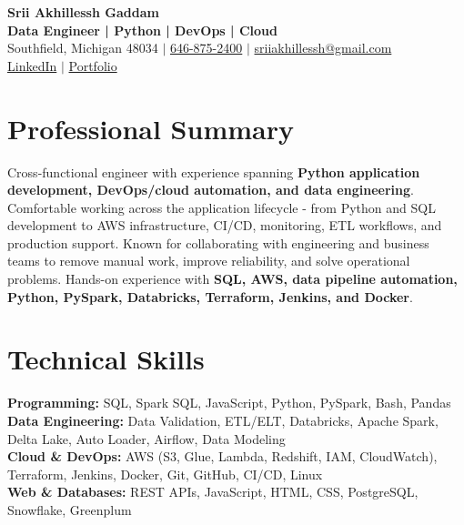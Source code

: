 \documentclass[letterpaper,10pt]{article}
\begin{document}
\fontsize{9.35pt}{10.45pt}\selectfont

\begin{center}
    {\LARGE \textbf{Srii Akhillessh Gaddam}} \\[-1pt]
    \textbf{Data Engineer | Python | DevOps | Cloud} \\[2pt]
    Southfield, Michigan 48034 $|$
    \href{tel:6468752400}{646-875-2400} $|$
    \href{mailto:sriiakhillessh@gmail.com}{sriiakhillessh@gmail.com} \\[1pt]
    \href{https://www.linkedin.com/in/srii-akhiilessh-gaddam-b48668191/}{LinkedIn} $|$
    \href{https://sriiakhillesshg.github.io/portfolio/}{Portfolio}
\end{center}
\vspace{-8pt}

\section{Professional Summary}
\small{Cross-functional engineer with experience spanning \textbf{Python application development, DevOps/cloud automation, and data engineering}. Comfortable working across the application lifecycle - from Python and SQL development to AWS infrastructure, CI/CD, monitoring, ETL workflows, and production support. Known for collaborating with engineering and business teams to remove manual work, improve reliability, and solve operational problems. Hands-on experience with \textbf{SQL, AWS, data pipeline automation, Python, PySpark, Databricks, Terraform, Jenkins, and Docker}.}

\section{Technical Skills}
\small{
\textbf{Programming:} SQL, Spark SQL, JavaScript, Python, PySpark, Bash, Pandas \\
\textbf{Data Engineering:} Data Validation, ETL/ELT, Databricks, Apache Spark, Delta Lake, Auto Loader, Airflow, Data Modeling \\
\textbf{Cloud \& DevOps:} AWS (S3, Glue, Lambda, Redshift, IAM, CloudWatch), Terraform, Jenkins, Docker, Git, GitHub, CI/CD, Linux \\
\textbf{Web \& Databases:} REST APIs, JavaScript, HTML, CSS, PostgreSQL, Snowflake, Greenplum
}

\end{document}

